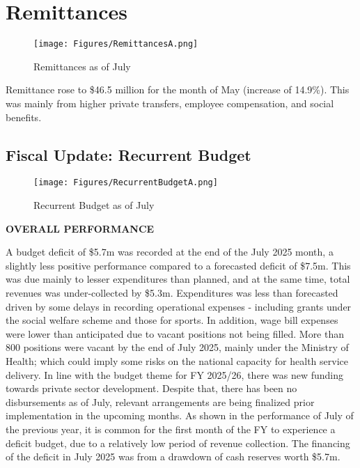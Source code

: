 \documentclass[11pt,a4paper]{setup}
\begin{document}
\section*{Remittances}
\begin{figure}[H]
    		\centering
    		\texttt{[image: Figures/RemittancesA.png]}
    		\caption{Remittances as of July}
    		\label{fig:figure}
    	\end{figure}


Remittance rose to \$46.5 million for the month of May (increase of 14.9\%). This was mainly from higher private transfers, employee compensation, and social benefits.

\newpage

\onecolumn


\subsection*{Fiscal Update: Recurrent Budget}
\begin{figure}[H]
    		\centering
    		\texttt{[image: Figures/RecurrentBudgetA.png]}
    		\caption{Recurrent Budget as of July}
    		\label{fig:figure}
    	\end{figure}

\begin{center}
\textbf{ OVERALL PERFORMANCE}    
\end{center}


\noindent A budget deficit of \$5.7m was recorded at the end of the July 2025 month, a slightly less positive performance compared to a forecasted deficit of \$7.5m. This was due mainly to lesser expenditures than planned, and at the same time, total revenues was under-collected by \$5.3m.
Expenditures was less than forecasted driven by some delays in recording operational expenses - including grants under the social welfare scheme and those for sports. In addition, wage bill expenses were lower than anticipated due to vacant positions not being filled. More than 800 positions were vacant by the end of July 2025, mainly under the Ministry of Health; which could imply some risks on the national capacity for health service delivery.
In line with the budget theme for FY 2025/26, there was new funding towards private sector development. Despite that, there has been no disbursements as of July, relevant arrangements are being finalized prior implementation in the upcoming months.
As shown in the performance of July of the previous year, it is common for the first month of the FY to experience a deficit budget, due to a relatively low period of revenue collection.
The financing of the deficit in July 2025 was from a drawdown of cash reserves worth \$5.7m.
\end{document}
